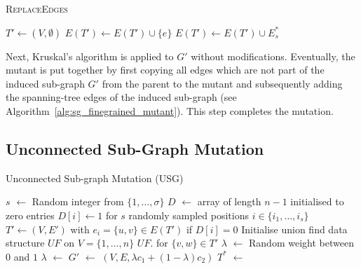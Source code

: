\documentclass[twoside]{article}
\begin{document}
\begin{algorithm}[H]
\caption{\textsc{ReplaceEdges}}
\label{alg:sg_finegrained_mutant}
\begin{algorithmic}[1] 
\State $T' \gets (V, \emptyset{})$ 
 
        \State $E(T') \gets E(T') \cup \{e\}$
    \EndIf
\EndFor
\State $E(T') \gets E(T') \cup E_s^{*}$ 
\State {}
\end{algorithmic}
\end{algorithm}

Next, Kruskal's algorithm is applied to $G'$ without modifications. Eventually, the mutant is put together by first copying all edges which are not part of the induced sub-graph $G'$ from the parent to the mutant and subsequently adding the spanning-tree edges of the induced sub-graph (see Algorithm~\ref{alg:sg_finegrained_mutant}). This step completes the mutation.

\subsection{Unconnected Sub-Graph Mutation}

\begin{algorithm}[t]
\caption{Unconnected Sub-graph Mutation (USG)}
\label{alg:usg_finegrained}
\begin{algorithmic}[1]
    \State $s$ $\gets$ Random integer from $\{1, \ldots, \sigma\}$
    \State $D$ $\gets$ array of length $n-1$ initialised to zero entries 
    \State $D[i] \gets 1$ for $s$ randomly sampled positions $i \in \{i_1, \ldots, i_s\}$
    \State $T' \gets (V, E')$ with $e_i = \{u,v\} \in E(T')$ if $D[i] = 0$ 
    \State Initialise union find data structure $UF$ on $V = \{1, \ldots, n\}$
    \State $UF$. for $\{v,w\} \in T'$ 
    \State $\lambda$ $\gets$ Random weight between $0$ and $1$
        \State $\lambda$ $\gets$ 
    \EndIf
    \State $G'$ $\gets$ $(V, E, \lambda c_1 + (1 - \lambda) c_2)$ 
    \State $T^{*}$ $\gets$  
    \State {}
\end{algorithmic}
\end{algorithm}
\end{document}
